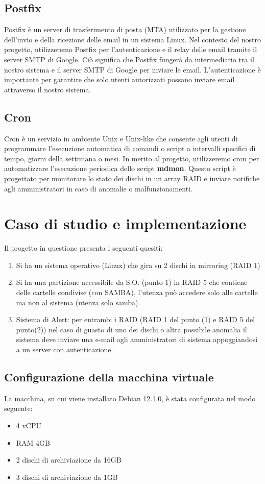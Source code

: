 \documentclass[11pt]{article}
\begin{document}
\subsection{Postfix}
Postfix è un server di trasferimento di posta (MTA) utilizzato per la gestione dell'invio e della ricezione delle email in un sistema Linux. Nel contesto del nostro progetto, utilizzeremo Postfix per l'autenticazione e il relay delle email tramite il server SMTP di Google. Ciò significa che Postfix fungerà da intermediario tra il nostro sistema e il server SMTP di Google per inviare le email. L'autenticazione è importante per garantire che solo utenti autorizzati possano inviare email attraverso il nostro sistema.

\subsection{Cron}
Cron è un servizio in ambiente Unix e Unix-like che consente agli utenti di programmare l'esecuzione automatica di comandi o script a intervalli specifici di tempo, giorni della settimana o mesi. In merito al progetto, utilizzeremo cron per automatizzare l'esecuzione periodica dello script \textbf{mdmon}. Questo script è progettato per monitorare lo stato dei dischi in un array RAID e inviare notifiche agli amministratori in caso di anomalie o malfunzionamenti.

\pagebreak

\section{Caso di studio e implementazione}
Il progetto in questione presenta i seguenti quesiti:
\begin{enumerate}
    \item Si ha un sistema operativo (Linux) che gira su 2 dischi in mirroring (RAID 1)
    \item Si ha una partizione accessibile da S.O. (punto 1) in RAID 5 che contiene delle cartelle condivise (con SAMBA), l'utenza può accedere solo alle cartelle ma non al sistema (utenza solo samba).
    \item Sistema di Alert: per entrambi i RAID (RAID 1 del punto (1) e RAID 5 del punto(2)) nel caso di guasto di uno dei dischi o altra possibile anomalia il sistema deve inviare una e-mail agli amministratori di sistema
appoggiandosi a un server con autenticazione.
\end{enumerate}

\subsection{Configurazione della macchina virtuale}
La macchina, su cui viene installato Debian 12.1.0, è stata configurata nel modo seguente:
\begin{itemize}
    \item 4 vCPU
    \item RAM 4GB
    \item 2 dischi di archiviazione da 16GB
    \item 3 dischi di archiviazione da 1GB
\end{itemize}
\end{document}
